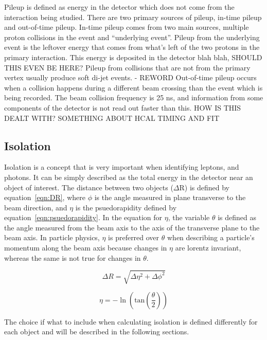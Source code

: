 Pileup is defined as energy in the detector which does not come from the interaction being studied.
There are two primary sources of pileup, in-time pileup and out-of-time pileup.
In-time pileup comes from two main sources, multiple proton collisions in the event and ``underlying event''.
Pileup from the underlying event is the leftover energy that comes from what's left of the two protons in the primary interaction.
This energy is deposited in the detector blah blah, SHOULD THIS EVEN BE HERE?
Pileup from collisions that are not from the primary vertex usually produce soft di-jet events. - REWORD
Out-of-time pileup occurs when a collision happens during a different beam crossing than the event which is being recorded. 
The beam collision frequency is 25 ns, and information from some components of the detector is not read out faster than this.
HOW IS THIS DEALT WITH? SOMETHING ABOUT HCAL TIMING AND FIT

\subsection{Isolation}
Isolation is a concept that is very important when identifying leptons, and photons.
It can be simply described as the total energy in the detector near an object of interest.
The distance between two objects ($\Delta$R) is defined by equation~\ref{eqn:DR},
where $\phi$ is the angle measured in plane transverse to the beam direction,
and $\eta$ is the psuedorapidity defined by equation~\ref{eqn:psuedorapidity}.
In the equation for $\eta$, the variable $\theta$ is defined as the angle measured from the beam axis to the axis of the transverse plane to the beam axis.
In particle physics, $\eta$ is preferred over $\theta$ when describing a particle's momentum along the beam axis because changes in $\eta$ are lorentz invariant,
whereas the same is not true for changes in $\theta$.

\begin{equation}
  \label{eqn:DR}
  \Delta R = \sqrt{\Delta\eta^{2}+\Delta\phi^{2}}
\end{equation}

\begin{equation}
  \label{eqn:psuedorapidity}
  \eta = -\ln(\mathrm{tan}(\frac{\theta}{2}))
\end{equation}

The choice if what to include when calculating isolation is defined differently for each object and will be described in the following sections.

